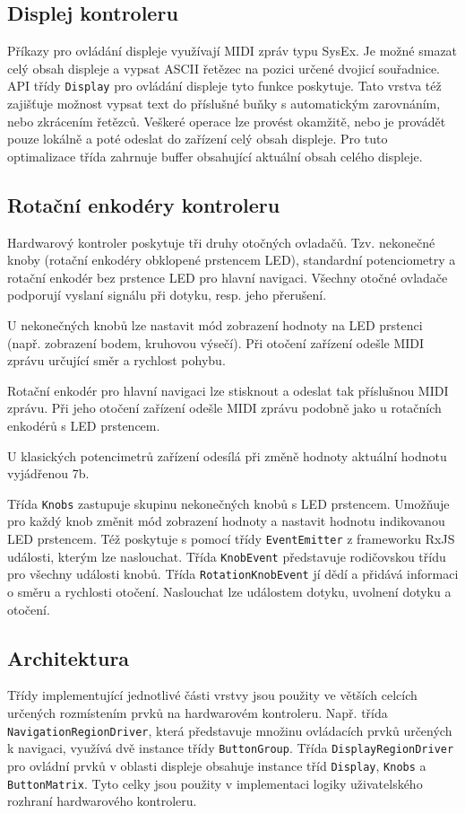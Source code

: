 \documentclass[thesis=M,czech]{FITthesis}[2019/03/06]
\begin{document}
		\subsection{Displej kontroleru}
		Příkazy pro ovládání displeje využívají MIDI zpráv typu SysEx. Je možné smazat celý obsah displeje a 
		vypsat ASCII řetězec na pozici určené dvojicí souřadnice. API třídy \texttt{Display} pro ovládání displeje tyto funkce poskytuje.
		Tato vrstva též zajišťuje možnost vypsat text do příslušné buňky s automatickým zarovnáním, nebo zkrácením řetězců.
		Veškeré operace lze provést okamžitě, nebo je provádět pouze lokálně a poté odeslat do zařízení celý obsah displeje.
		Pro tuto optimalizace třída zahrnuje buffer obsahující aktuální obsah celého displeje.

		\subsection{Rotační enkodéry kontroleru}
		Hardwarový kontroler poskytuje tři druhy otočných ovladačů. Tzv. nekonečné knoby (rotační enkodéry obklopené
		prstencem LED), standardní potenciometry a rotační enkodér bez prstence LED pro hlavní navigaci.
		Všechny otočné ovladače podporují vyslaní signálu při dotyku, resp. jeho přerušení. 
		
		U nekonečných knobů lze nastavit mód zobrazení hodnoty na LED prstenci (např. zobrazení bodem, kruhovou výsečí).
		Při otočení zařízení odešle MIDI zprávu určující směr a rychlost pohybu.
		
		Rotační enkodér pro	hlavní navigaci lze stisknout a odeslat tak příslušnou MIDI zprávu. Při jeho otočení
		zařízení odešle MIDI zprávu podobně jako u rotačních enkodérů s LED prstencem.
		
		U klasických potencimetrů zařízení odesílá při změně hodnoty aktuální hodnotu vyjádřenou 7b.
		
		Třída \texttt{Knobs} zastupuje skupinu nekonečných knobů s LED prstencem. Umožňuje pro každý knob změnit mód zobrazení hodnoty a
		nastavit hodnotu indikovanou LED prstencem. Též poskytuje s pomocí třídy \texttt{EventEmitter} z frameworku RxJS události, kterým lze naslouchat.
		Třída \texttt{KnobEvent} představuje rodičovskou třídu pro všechny události knobů. Třída \texttt{RotationKnobEvent} jí dědí a přidává informaci
		o směru a rychlosti otočení. Naslouchat lze událostem dotyku, uvolnení dotyku a otočení.
		
		\subsection{Architektura}
		Třídy implementující jednotlivé části vrstvy jsou použity ve větších celcích určených rozmístením prvků na hardwarovém kontroleru.
		Např. třída \linebreak	\texttt{NavigationRegionDriver}, která představuje množinu ovládacích prvků určených k navigaci, využívá dvě instance třídy \texttt{ButtonGroup}.
		Třída \texttt{DisplayRegionDriver} pro ovládní prvků v oblasti displeje obsahuje instance tříd \texttt{Display}, \texttt{Knobs} a \texttt{ButtonMatrix}.
		Tyto celky jsou použity v implementaci logiky uživatelského rozhraní hardwarového kontroleru.
		
\end{document}
